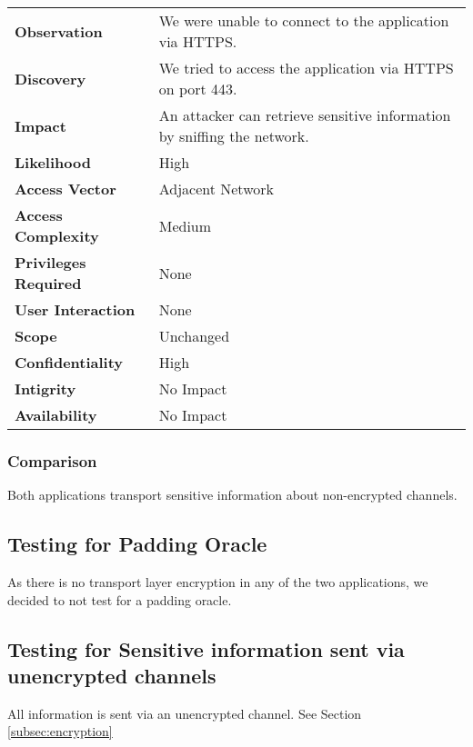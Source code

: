 \begin{tabular}{l|p{10cm}}

\textbf{Observation} & We were unable to connect to the application via HTTPS.  \\
\textbf{Discovery} & We tried to access the application via HTTPS on port 443. \\
\textbf{Impact} & An attacker can retrieve sensitive information by sniffing the network. \\
\textbf{Likelihood} & High \\
\textbf{Access Vector} & Adjacent Network \\
\textbf{Access Complexity} & Medium \\
\textbf{Privileges Required} & None \\
\textbf{User Interaction} & None \\
\textbf{Scope} & Unchanged \\
\textbf{Confidentiality} & High \\
\textbf{Intigrity} & No Impact \\
\textbf{Availability} & No Impact \\
\end{tabular}

\subsubsection*{Comparison}
Both applications transport sensitive information about non-encrypted channels.

\clearpage


\subsection{Testing for Padding Oracle}
As there is no transport layer encryption in any of the two applications, we decided to not test for a padding oracle.

\subsection{Testing for Sensitive information sent via unencrypted channels}
All information is sent via an unencrypted channel. See Section \ref{subsec:encryption}

\clearpage












